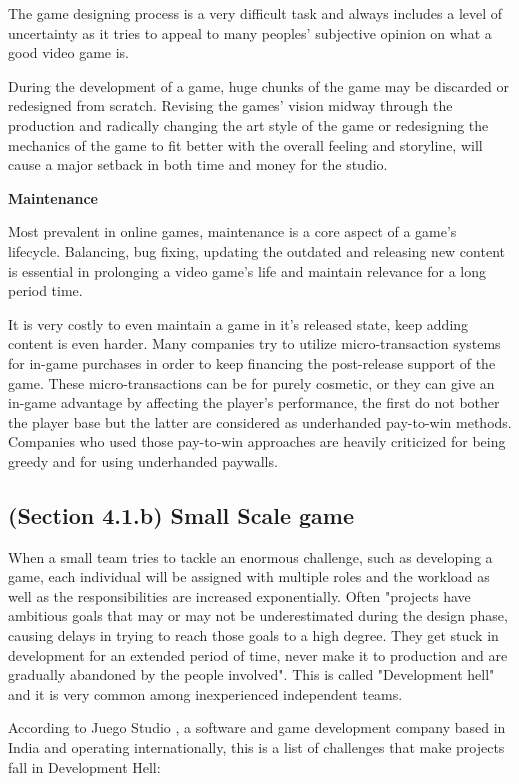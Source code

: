 \documentclass[a4paper,one side,12pt]{book}
\begin{document}
The game designing process is a very difficult task and always includes
a level of uncertainty as it tries to appeal to many peoples' subjective
opinion on what a good video game is.

During the development of a game, huge chunks of the game may be
discarded or redesigned from scratch. Revising the games' vision midway
through the production and radically changing the art style of the game
or redesigning the mechanics of the game to fit better with the overall
feeling and storyline, will cause a major setback in both time and money
for the studio.

\textbf{{Maintenance}}

Most prevalent in online games, maintenance is a core aspect of a game's
lifecycle. Balancing, bug fixing, updating the outdated and releasing
new content is essential in prolonging a video game's life and maintain
relevance for a long period time.

It is very costly to even maintain a game in it's released state, keep
adding content is even harder. Many companies try to utilize
micro-transaction systems for in-game purchases in order to keep
financing the post-release support of the game. These micro-transactions
can be for purely cosmetic, or they can give an in-game advantage by
affecting the player's performance, the first do not bother the player
base but the latter are considered as underhanded pay-to-win methods.
Companies who used those pay-to-win approaches are heavily criticized
for being greedy and for using underhanded paywalls.


\subsection{(Section 4.1.b) Small Scale game}

When a small team tries to tackle an enormous challenge, such as
developing a game, each individual will be assigned with multiple roles
and the workload as well as the responsibilities are increased
exponentially. Often "projects have ambitious goals that may or may not
be underestimated during the design phase, causing delays in trying to
reach those goals to a high degree. They get stuck in development for an
extended period of time, never make it to production and are gradually
abandoned by the people involved"\cite{juego}. This is called
"Development hell" and it is very common among inexperienced independent
teams.

According to Juego Studio \cite{juego}, a software and game development
company based in India and operating internationally, this is a list of
challenges that make projects fall in Development Hell:
\end{document}

